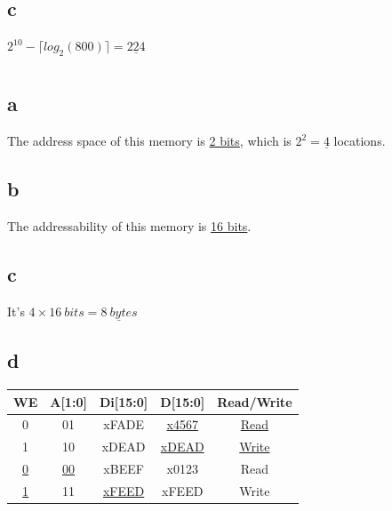 \documentclass[11pt,a4paper]{article}
\begin{document}
	\subsection*{c}
	$2^{10}-\lceil log_2(800)\rceil=\underline{224}$
	
	\section{}
	\subsection*{a}
	The address space of this memory is \underline{2 bits}, which is $2^{2}=\underline{4}$ locations.
	\subsection*{b}
	The addressability of this memory is \underline{16 bits}.
	\subsection*{c}
	It's $4\times 16\ bits=\underline{8\ bytes}$
	\subsection*{d}
	\begin{tabular}{|c|c|c|c|c|}
		\hline 
		WE & A[1:0] & Di[15:0] & D[15:0] & Read/Write \\ 
		\hline 
		0 & 01 & xFADE & \underline{x4567} & \underline{Read} \\ 
		\hline 
		1 & 10 & xDEAD & \underline{xDEAD} & \underline{Write} \\ 
		\hline 
		\underline{0} & \underline{00} & xBEEF & x0123 & Read \\ 
		\hline 
		\underline{1} & 11 & \underline{xFEED} & xFEED & Write \\ 
		\hline 
	\end{tabular} 
	
\end{document}
